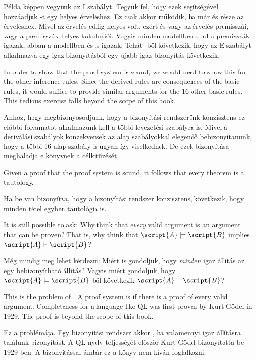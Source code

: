 Példa képpen vegyünk az {\eand}I szabályt. Tegyük fel, hogy ezek segítségével hozzáadjuk \eand{}-t egy helyes érveléshez. Ez csak akkor működik, ha már  és  része az érvelésnek. Mivel az érvelés eddig helyes volt, ezért  és  vagy az érvelés premisszái, vagy a premisszák helyes koknluziói. Vagyis minden modellben ahol a premisszák igazak, abban a modellben  és  is igazak. Tehát \eand{}-ből következik, hogy az {\eand}E szabályt alkalmazva egy igaz bizonyításból egy újabb igaz bizonyítás következik.

In order to show that the proof system is sound, we would need to show this for the other inference rules. Since the derived rules are consequences of the basic rules, it would suffice to provide similar arguments for the 16 other basic rules. This tedious exercise falls beyond the scope of this book.

Ahhoz, hogy megbizonyosodjunk, hogy a bizonyítási rendszerünk konzisztens ez előbbi folyamatot alkalmazunk kell a többi levezetési szabályra is. Mivel a deriválási szabályok konzekvensek az alap szabályokkal elegendő bebizonyítanunk, hogy a többi 16 alap szabály is ugyan így viselkednek. De ezek bizonyítása meghaladja e könyvnek a célkitűzését.

Given a proof that the proof system is sound, it follows that every theorem is a tautology.

Ha be van bizonyítva, hogy a bizonyítási rendszer konzisztens, következik, hogy minden tétel egyben tautológia is.

It is still possible to ask: Why think that \emph{every} valid argument is an argument that can be proven?  That is, why think that $\script{A}\models\script{B}$ implies $\script{A}\vdash\script{B}$?

Még mindig meg lehet kérdezni: Miért is gondoljuk, hogy \emph{minden} igaz állítás az egy bebizonyítható állítás? Vagyis miért gondoljuk, hogy  $\script{A}\models\script{B}$-ből következik $\script{A}\vdash\script{B}$?

This is the problem of . A proof system is  if there is a proof of every valid argument. Completeness for a language like QL was first proven by Kurt G\"odel in 1929. The proof is beyond the scope of this book.

Ez a  problémája. Egy bizonyítási rendszer akkor , ha valamennyi igaz állításra találunk bizonyítást. A QL nyelv teljességét először Kurt Gödel bizonyította be 1929-ben. A bizonyítással ámbár ez a könyv nem kíván foglalkozni.

